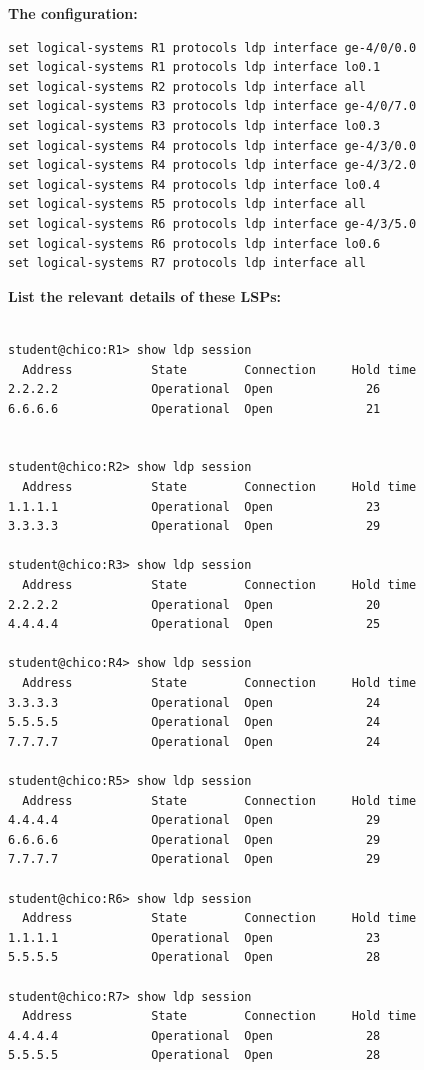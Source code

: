 \documentclass[a4paper]{article}
\begin{document}
\textbf{The configuration:}

\begin{verbatim}
set logical-systems R1 protocols ldp interface ge-4/0/0.0
set logical-systems R1 protocols ldp interface lo0.1
set logical-systems R2 protocols ldp interface all
set logical-systems R3 protocols ldp interface ge-4/0/7.0
set logical-systems R3 protocols ldp interface lo0.3
set logical-systems R4 protocols ldp interface ge-4/3/0.0
set logical-systems R4 protocols ldp interface ge-4/3/2.0
set logical-systems R4 protocols ldp interface lo0.4
set logical-systems R5 protocols ldp interface all
set logical-systems R6 protocols ldp interface ge-4/3/5.0
set logical-systems R6 protocols ldp interface lo0.6
set logical-systems R7 protocols ldp interface all    
\end{verbatim}


\textbf{List the relevant details of these LSPs:}

\begin{verbatim}
    
student@chico:R1> show ldp session             
  Address           State        Connection     Hold time
2.2.2.2             Operational  Open             26
6.6.6.6             Operational  Open             21


student@chico:R2> show ldp session             
  Address           State        Connection     Hold time
1.1.1.1             Operational  Open             23
3.3.3.3             Operational  Open             29

student@chico:R3> show ldp session             
  Address           State        Connection     Hold time
2.2.2.2             Operational  Open             20
4.4.4.4             Operational  Open             25
    
student@chico:R4> show ldp session             
  Address           State        Connection     Hold time
3.3.3.3             Operational  Open             24
5.5.5.5             Operational  Open             24
7.7.7.7             Operational  Open             24

student@chico:R5> show ldp session             
  Address           State        Connection     Hold time
4.4.4.4             Operational  Open             29
6.6.6.6             Operational  Open             29
7.7.7.7             Operational  Open             29

student@chico:R6> show ldp session             
  Address           State        Connection     Hold time
1.1.1.1             Operational  Open             23
5.5.5.5             Operational  Open             28

student@chico:R7> show ldp session 
  Address           State        Connection     Hold time
4.4.4.4             Operational  Open             28
5.5.5.5             Operational  Open             28


\end{verbatim}
\end{document}

